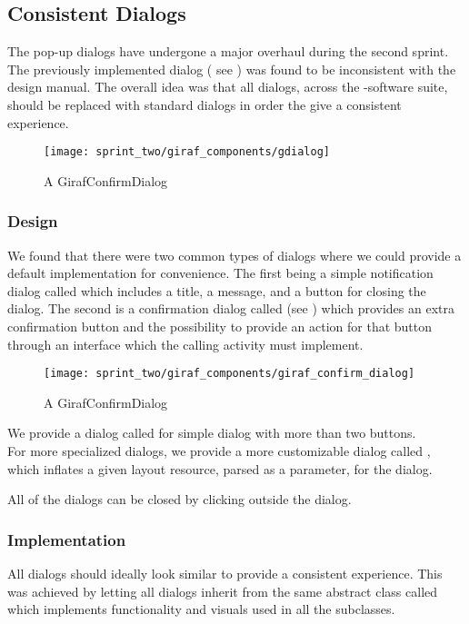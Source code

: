 \subsection{Consistent Dialogs}
\label{sec:consistent_dialogs}

The pop-up dialogs have undergone a major overhaul during the second sprint. The previously implemented dialog ( see ) was found to be inconsistent with the \giraf design manual. The overall idea was that all dialogs, across the \giraf-software suite, should be replaced with standard dialogs in order the give a consistent experience. 

\begin{figure}[!htbp]
    \centering
    \texttt{[image: sprint\_two/giraf\_components/gdialog]}
    \caption{A GirafConfirmDialog}
    \label{fig:gdialog}
\end{figure}

\subsubsection{Design}

We found that there were two common types of dialogs where we could provide a default implementation for convenience. The first being a simple notification dialog called  which includes a title, a message, and a button for closing the dialog. The second is a confirmation dialog called  (see ) which provides an extra confirmation button and the possibility to provide an action for that button through an interface which the calling activity must implement. 

\begin{figure}[!htbp]
    \centering
    \texttt{[image: sprint\_two/giraf\_components/giraf\_confirm\_dialog]}
    \caption{A GirafConfirmDialog}
    \label{fig:giraf_confirm_dialog}
\end{figure}

We provide a dialog called  for simple dialog with more than two buttons.\\

For more specialized dialogs, we provide a more customizable dialog called , which inflates a given layout resource, parsed as a parameter, for the dialog.

All of the dialogs can be closed by clicking outside the dialog.

\subsubsection{Implementation}

All dialogs should ideally look similar to provide a consistent experience. This was achieved by letting all dialogs inherit from the same abstract class called  which implements functionality and visuals used in all the subclasses.

